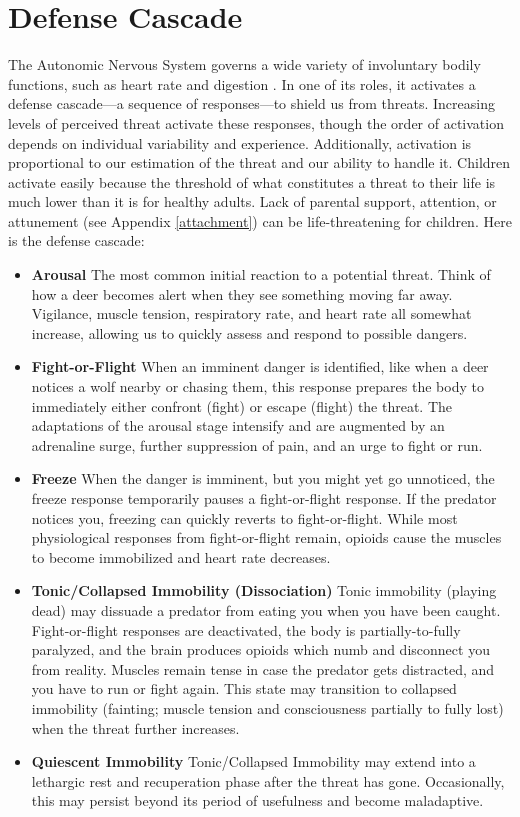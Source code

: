 \documentclass[12pt,letterpaper]{book}
\begin{document}
\section{Defense Cascade}
\label{sec:defensecascade}
The Autonomic Nervous System governs a wide variety of involuntary bodily functions, such as heart rate and digestion \cite{kozlowskaDefenseCascade}. In one of its roles, it activates a defense cascade—a sequence of responses—to shield us from threats. Increasing levels of perceived threat activate these responses, though the order of activation depends on individual variability and experience. Additionally, activation is proportional to our estimation of the threat and our ability to handle it. Children activate easily because the threshold of what constitutes a threat to their life is much lower than it is for healthy adults. Lack of parental support, attention, or attunement (see Appendix \ref{attachment}) can be life-threatening for children. Here is the defense cascade:
\begin{itemize}
    \item \textbf{Arousal} The most common initial reaction to a potential threat. Think of how a deer becomes alert when they see something moving far away. Vigilance, muscle tension, respiratory rate, and heart rate all somewhat increase, allowing us to quickly assess and respond to possible dangers.
    \item \textbf{Fight-or-Flight} When an imminent danger is identified, like when a deer notices a wolf nearby or chasing them, this response prepares the body to immediately either confront (fight) or escape (flight) the threat. The adaptations of the arousal stage intensify and are augmented by an adrenaline surge, further suppression of pain, and an urge to fight or run.
    \item \textbf{Freeze} When the danger is imminent, but you might yet go unnoticed, the freeze response temporarily pauses a fight-or-flight response. If the predator notices you, freezing can quickly reverts to fight-or-flight. While most physiological responses from fight-or-flight remain, opioids cause the muscles to become immobilized and heart rate decreases.
    \item \textbf{Tonic/Collapsed Immobility (Dissociation)} Tonic immobility (playing dead) may dissuade a predator from eating you when you have been caught. Fight-or-flight responses are deactivated, the body is partially-to-fully paralyzed, and the brain produces opioids which numb and disconnect you from reality. Muscles remain tense in case the predator gets distracted, and you have to run or fight again. This state may transition to collapsed immobility (fainting; muscle tension and consciousness partially to fully lost) when the threat further increases.
    \item \textbf{Quiescent Immobility} Tonic/Collapsed Immobility may extend into a lethargic rest and recuperation phase after the threat has gone. Occasionally, this may persist beyond its period of usefulness and become maladaptive.
\end{itemize}
\end{document}
